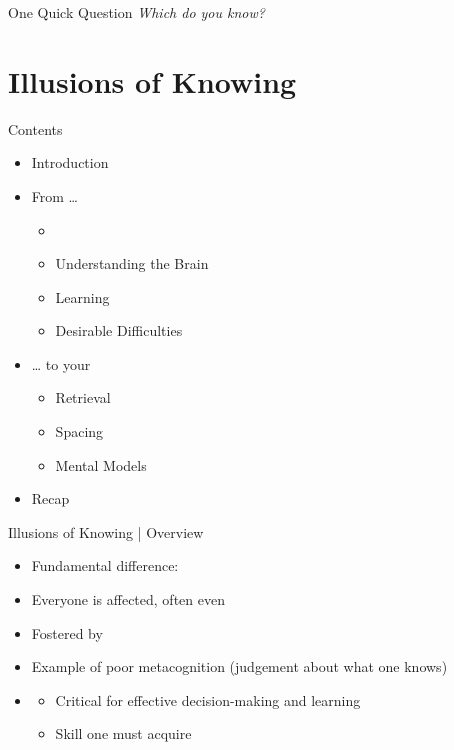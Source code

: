 \documentclass{ercisbeamer}
\begin{document}
\begin{frame}{One Quick Question}
    \centering \emph{Which  do you know?}
\end{frame}

\section{Illusions of Knowing}
\begin{frame}{Contents}
    \begin{itemize}
        \item Introduction
        \item From …
        \begin{itemize}
            \item {}
            \item Understanding the Brain
            \item Learning
            \item Desirable Difficulties
        \end{itemize}
        \item … to your 
        \begin{itemize}
            \item Retrieval
            \item Spacing
            \item Mental Models
        \end{itemize}
        \item Recap
    \end{itemize}
\end{frame}

\begin{frame}{Illusions of Knowing | Overview}
    \begin{tbox}
        \begin{itemize}
            \item Fundamental difference: 
            \item Everyone is affected, often  even 
            \item Fostered by 
            \item Example of poor metacognition (judgement about what one knows)
            \item {}
            \begin{itemize}
                \item Critical for effective decision-making and learning
                \item Skill one must acquire
            \end{itemize}
        \end{itemize}
    \end{tbox}
\end{frame}
\end{document}
